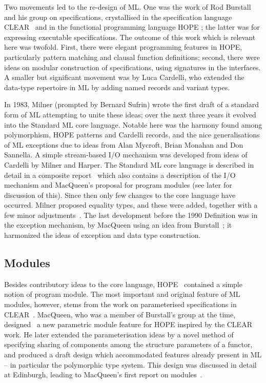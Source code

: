 Two movements led to the re-design of ML.  One was the work of Rod
Burstall and his group on specifications, crystallised in the specification
language CLEAR~\cite{BG} and in the functional programming language HOPE
\cite{BMS};  the latter was for expressing executable specifications.  The
outcome of this work which is relevant here was twofold.  First, there were
elegant programming features in HOPE, particularly pattern matching and
clausal function definitions; second, there were ideas on modular construction
of specifications, using signatures in the interfaces.  A smaller but
significant movement was by Luca Cardelli, who extended the data-type
repertoire in ML by adding named records and variant types.

In 1983, Milner (prompted by Bernard Sufrin) wrote the first draft of a
standard form of ML attempting to unite these ideas; over the next three years
it evolved into the Standard ML core language.  Notable here was the harmony
found among polymorphism, HOPE patterns and Cardelli records, and the nice
generalisations of ML exceptions due to ideas from Alan Mycroft, Brian Monahan
and Don Sannella.  A simple stream-based I/O mechanism was developed from
ideas of Cardelli by Milner and Harper.  The Standard ML core language is
described in detail in a composite report~\cite{HMM} which also contains a
description of the I/O mechanism and MacQueen's proposal for program modules
(see later for discussion of this). Since then only few changes to the core
language have occurred.  Milner proposed equality types, and these were added,
together with a few minor adjustments~\cite{Mil3}.  The 
last development before the 1990 Definition was in the exception mechanism, by MacQueen using an idea
from Burstall~\cite{AMMT}; it harmonized the ideas of exception and data type
construction.

\subsection*{Modules}

Besides contributory ideas to the core language, HOPE~\cite{BMS} contained a
simple notion of program module.  The most important and original feature of
ML modules, however, stems from the work on parameterised specifications in
CLEAR~\cite{BG}.  MacQueen, who was a member of Burstall's group at the time,
designed~\cite{Mac} a new parametric module feature for HOPE inspired by the
CLEAR work.  He later extended the parameterisation ideas by a novel method of
specifying sharing of components among the structure parameters of a functor,
and produced a draft design which accommodated features already present in ML
-- in particular the polymorphic type system.  This design was discussed in
detail at Edinburgh, leading to MacQueen's first report on modules~\cite{HMM}.

